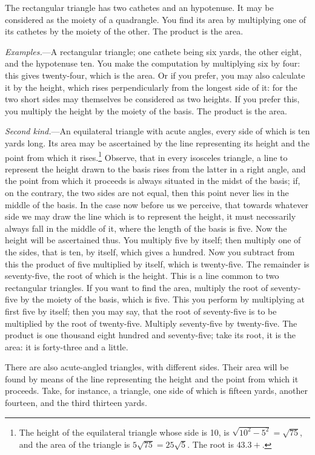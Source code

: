 The rectangular triangle has two cathetes and an hypotenuse. It may be considered as the moiety of a quadrangle. You find its area by multiplying one of its cathetes by the moiety of the other. The product is the area.

\textit{Examples.}---A rectangular triangle; one cathete being six yards, the other eight, and the hypotenuse ten. You make the computation by multiplying six by four: this gives twenty-four, which is the area. Or if you prefer, you may also calculate it by the height, which rises perpendicularly from the longest side of it: for the two short sides may themselves be considered as two heights. If you prefer this, you multiply the height by the moiety of the basis. The product is the area.

\textit{Second kind.}---An equilateral triangle with acute angles, every side of which is ten yards long. Its area may be ascertained by the line representing its height and the point from which it rises.\footnote{The height of the equilateral triangle whose side is 10, is $\sqrt{10^2 - 5^2} = \sqrt{75}$, and the area of the triangle is $5\sqrt{75} = 25\sqrt{5}$. The root is $43.3+$.} Observe, that in every isosceles triangle, a line to represent the height drawn to the basis rises from the latter in a right angle, and the point from which it proceeds is always situated in the midst of the basis; if, on the contrary, the two sides are not equal, then this point never lies in the middle of the basis. In the case now before us we perceive, that towards whatever side we may draw the line which is to represent the height, it must necessarily always fall in the middle of it, where the length of the basis is five. Now the height will be ascertained thus. You multiply five by itself; then multiply one of the sides, that is ten, by itself, which gives a hundred. Now you subtract from this the product of five multiplied by itself, which is twenty-five. The remainder is seventy-five, the root of which is the height. This is a line common to two rectangular triangles. If you want to find the area, multiply the root of seventy-five by the moiety of the basis, which is five. This you perform by multiplying at first five by itself; then you may say, that the root of seventy-five is to be multiplied by the root of twenty-five. Multiply seventy-five by twenty-five. The product is one thousand eight hundred and seventy-five; take its root, it is the area: it is forty-three and a little.

There are also acute-angled triangles, with different sides. Their area will be found by means of the line representing the height and the point from which it proceeds. Take, for instance, a triangle, one side of which is fifteen yards, another fourteen, and the third thirteen yards.

